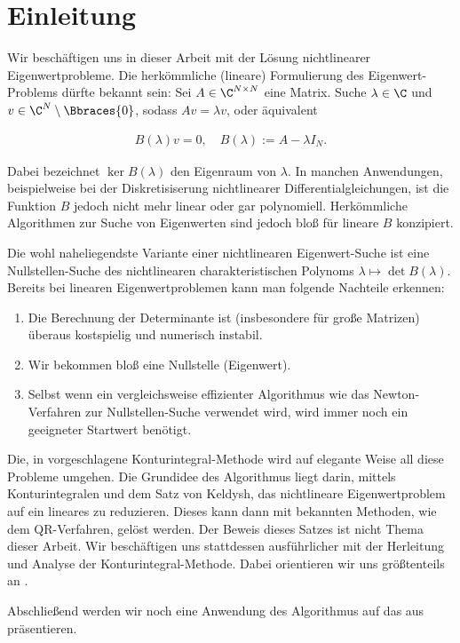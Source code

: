 \chapter{Einleitung}

Wir beschäftigen uns in dieser Arbeit mit der Lösung nichtlinearer Eigenwertprobleme.
Die herkömmliche (lineare) Formulierung des Eigenwert-Problems dürfte bekannt sein:
Sei $A \in \C^{N \times N}$ eine Matrix.
Suche $\lambda \in \C$ und $v \in \C^N \setminus \Bbraces{0}$, sodass $A v = \lambda v$, oder äquivalent

\begin{align} \label{eq:lineares_ewp}
    B(\lambda) v = 0,
    \quad
    B(\lambda) := A - \lambda I_N.
\end{align}

Dabei bezeichnet $\ker B(\lambda)$ den Eigenraum von $\lambda$.
In manchen Anwendungen, beispielweise bei der Diskretisiserung nichtlinearer Differentialgleichungen, ist die Funktion $B$ jedoch nicht mehr linear oder gar polynomiell.
Herkömmliche Algorithmen zur Suche von Eigenwerten sind jedoch bloß für lineare $B$ konzipiert.

Die wohl naheliegendste Variante einer nichtlinearen Eigenwert-Suche ist eine Nullstellen-Suche des nichtlinearen charakteristischen Polynoms $\lambda \mapsto \det B(\lambda)$.
Bereits bei linearen Eigenwertproblemen kann man folgende Nachteile erkennen:

\begin{enumerate}[label = \arabic*.]
    \item Die Berechnung der Determinante ist (insbesondere für große Matrizen) überaus kostspielig und numerisch instabil.
    \item Wir bekommen bloß eine Nullstelle (Eigenwert).
    \item Selbst wenn ein vergleichsweise effizienter Algorithmus wie das Newton-Verfahren zur Nullstellen-Suche verwendet wird, wird immer noch ein geeigneter Startwert benötigt.
\end{enumerate}

Die, in \cite{BEYN20123839} vorgeschlagene Konturintegral-Methode wird auf elegante Weise all diese Probleme umgehen.
Die Grundidee des Algorithmus liegt darin, mittels Konturintegralen und dem Satz von Keldysh, das nichtlineare Eigenwertproblem auf ein lineares zu reduzieren.
Dieses kann dann mit bekannten Methoden, wie dem QR-Verfahren, gelöst werden.
Der Beweis dieses Satzes ist nicht Thema dieser Arbeit.
Wir beschäftigen uns stattdessen ausführlicher mit der Herleitung und Analyse der Konturintegral-Methode.
Dabei orientieren wir uns größtenteils an \cite{EWPs}.

Abschließend werden wir noch eine Anwendung des Algorithmus auf das  aus \cite{saad2020rational} präsentieren.
